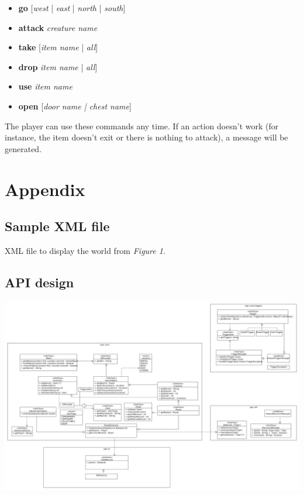 \documentclass[dvips,12pt]{article}
\begin{document}
\begin{itemize}
	\item{\textbf{go} [\emph{west} | \emph{east} | \emph{north} | \emph{south}]}
	\item{\textbf{attack} \emph{creature name}}
	\item{\textbf{take} [\emph{item name} | \emph{all}]}
	\item{\textbf{drop} \emph{item name} | \emph{all}]}
	\item{\textbf{use} \emph{item name}}
	\item{\textbf{open} [\emph{\emph{door name} | \emph{chest name}}]}
\end{itemize}

The player can use these commands any time. If an action doesn't work (for instance, the item doesn't exit or there is nothing to attack), a message will be generated.

\section{Appendix}

\label{App:xml}

\subsection{Sample XML file}


XML file to display the world from \emph{Figure 1}.


\subsection{API design}
\includegraphics[width=6.5in]{assets/class-diagram.png}
\end{document}
